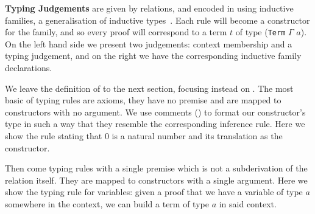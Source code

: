 
\textbf{Typing Judgements} are given by relations, and encoded in
\Idris{} using inductive families, a generalisation of inductive
types~\cite{DBLP:journals/fac/Dybjer94}.
%
Each rule will become a constructor for the family, and so every
proof \inferenceRule{} will correspond to a term $t$ of type
(\texttt{Term} $\Gamma$ $a$).
%
On the left hand side we present two judgements: context membership
and a typing judgement, and on the right we have the corresponding
inductive family declarations.

\begin{center}
\begin{minipage}{0.10\textwidth}
\varRule
\inferenceRule
\end{minipage}\hfill
\begin{minipage}{0.80\textwidth}
\end{minipage}
\end{center}

We leave the definition of  to the next section,
focusing instead on .
%
The most basic of typing rules are axioms, they have no premise
and are mapped to constructors with no argument.
We use \Idris{} comments (\IdrisComment{\KatlaDash{}\KatlaDash})
to format our constructor's type in such
a way that they resemble the corresponding inference rule.
%
Here we show the rule stating that $0$ is a natural number and
its translation as the  constructor.

\begin{center}
\begin{minipage}{0.45\textwidth}
\inferenceZero
\end{minipage}\hfill
\begin{minipage}{0.45\textwidth}
\end{minipage}
\end{center}

Then come typing rules with a single premise which is not a subderivation
of the relation itself.
They are mapped to constructors with a single argument.
%
Here we show the typing rule for variables: given a proof that we have a
variable of type $a$ somewhere in the context, we can build a term of type
$a$ in said context.

\begin{center}
\begin{minipage}{0.45\textwidth}
\inferenceVar
\end{minipage}\hfill
\begin{minipage}{0.45\textwidth}
\end{minipage}
\end{center}

